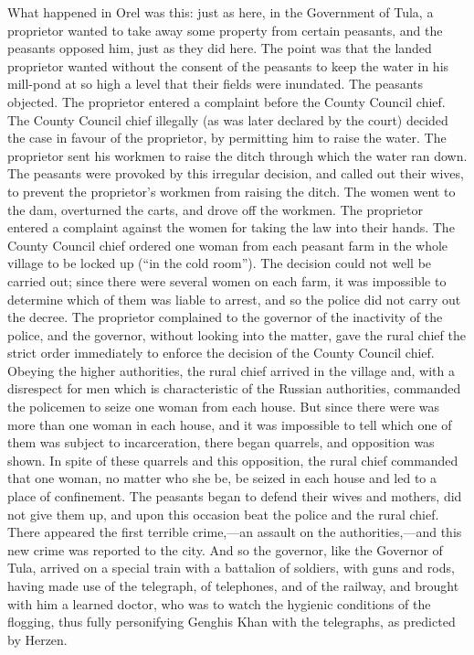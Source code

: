 \documentclass{book}
\begin{document}
What happened in Orel was this: just as here, in the Government of Tula, a proprietor wanted to take away some property from certain peasants, and the peasants opposed him, just as they did here. The point was that the landed proprietor wanted without the consent of the peasants to keep the water in his mill-pond at so high a level that their fields were inundated. The peasants objected. The proprietor entered a complaint before the County Council chief. The County Council chief illegally (as was later declared by the court) decided the case in favour of the proprietor, by permitting him to raise the water. The proprietor sent his workmen to raise the ditch through which the water ran down. The peasants were provoked by this irregular decision, and called out their wives, to prevent the proprietor’s workmen from raising the ditch. The women went to the dam, overturned the carts, and drove off the workmen. The proprietor entered a complaint against the women for taking the law into their hands. The County Council chief ordered one woman from each peasant farm in the whole village to be locked up (“in the cold room”). The decision could not well be carried out; since there were several women on each farm, it was impossible to determine which of them was liable to arrest, and so the police did not carry out the decree. The proprietor complained to the governor of the inactivity of the police, and the governor, without looking into the matter, gave the rural chief the strict order immediately to enforce the decision of the County Council chief. Obeying the higher authorities, the rural chief arrived in the village and, with a disrespect for men which is characteristic of the Russian authorities, commanded the policemen to seize one woman from each house. But since there were was more than one woman in each house, and it was impossible to tell which one of them was subject to incarceration, there began quarrels, and opposition was shown. In spite of these quarrels and this opposition, the rural chief commanded that one woman, no matter who she be, be seized in each house and led to a place of confinement. The peasants began to defend their wives and mothers, did not give them up, and upon this occasion beat the police and the rural chief. There appeared the first terrible crime,—an assault on the authorities,—and this new crime was reported to the city. And so the governor, like the Governor of Tula, arrived on a special train with a battalion of soldiers, with guns and rods, having made use of the telegraph, of telephones, and of the railway, and brought with him a learned doctor, who was to watch the hygienic conditions of the flogging, thus fully personifying Genghis Khan with the telegraphs, as predicted by Herzen.
\end{document}
